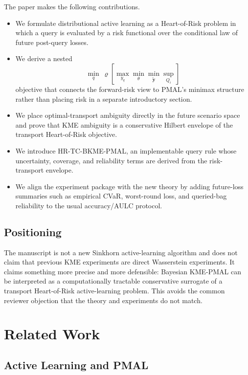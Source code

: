 \documentclass[10pt,journal]{IEEEtran}
\newcommand{\risk}{\varrho}
\begin{document}
The paper makes the following contributions.
\begin{itemize}[leftmargin=1.1em]
    \item We formulate distributional active learning as a Heart-of-Risk problem in which a query is evaluated by a risk functional over the conditional law of future post-query losses.
    \item We derive a nested
    \begin{equation*}
        \min_q\ \risk\!\left[\max_{y_q}\min_\theta\min_{\tilde{\mathbf y}}\sup_{Q_i}\right]
    \end{equation*}
    objective that connects the forward-risk view to PMAL's minimax structure rather than placing risk in a separate introductory section.
    \item We place optimal-transport ambiguity directly in the future scenario space and prove that KME ambiguity is a conservative Hilbert envelope of the transport Heart-of-Risk objective.
    \item We introduce HR-TC-BKME-PMAL, an implementable query rule whose uncertainty, coverage, and reliability terms are derived from the risk-transport envelope.
    \item We align the experiment package with the new theory by adding future-loss summaries such as empirical CVaR, worst-round loss, and queried-bag reliability to the usual accuracy/AULC protocol.
\end{itemize}

\subsection{Positioning}

The manuscript is not a new Sinkhorn active-learning algorithm and does not claim that previous KME experiments are direct Wasserstein experiments. It claims something more precise and more defensible: Bayesian KME-PMAL can be interpreted as a computationally tractable conservative surrogate of a transport Heart-of-Risk active-learning problem. This avoids the common reviewer objection that the theory and experiments do not match.

\section{Related Work}
\label{sec:related}

\subsection{Active Learning and PMAL}
\end{document}

